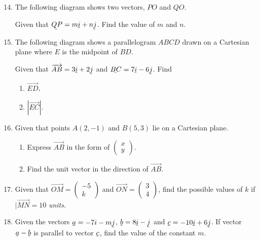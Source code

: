 \documentclass{report}
\renewcommand{\vec}[1]{\underaccent{\tilde}{#1}}
\begin{document}
\begin{multicols*}{2}
    \begin{enumerate}

        \setcounter{enumi}{13}

        \item The following diagram shows two vectors, $PO$ and $QO$.

              Given that $\vec{QP} = m\vec{i} + n\vec{j}$. Find the value of $m$ and $n$.

        \item The following diagram shows a parallelogram $ABCD$ drawn on a Cartesian plane
              where $E$ is the midpoint of $BD$.

              Given that $\overrightarrow{AB} = 3\vec{i}+2\vec{j}$ and $\vec{BC} = 7\vec{i} -
                  6\vec{j}$. Find
              \begin{enumerate}
                  \item $\overrightarrow{ED}$,
                  \item $|\overrightarrow{EC}|.$
              \end{enumerate}

        \item Given that points $A(2, -1)$ and $B(5, 3)$ lie on a Cartesian plane.
              \begin{enumerate}
                  \item Express $\overrightarrow{AB}$ in the form of $\begin{pmatrix}
                                x \\y
                            \end{pmatrix}$.
                  \item Find the unit vector in the direction of $\overrightarrow{AB}$.
              \end{enumerate}

        \item Given that $\overrightarrow{OM} = \begin{pmatrix}
                      -5 \\k
                  \end{pmatrix}$ and $\overrightarrow{ON} = \begin{pmatrix}
                      3 \\4
                  \end{pmatrix}$, find the possible values of $k$ if $|\overrightarrow{MN} = 10$\textit{ units}.

        \item Given the vectors $\vec{a} = -7i - m\vec{j}$, $\vec{b} = 8\vec{i} - \vec{j}$
              and $\vec{c} = -10\vec{i} + 6\vec{j}$. If vector $\vec{a} - \vec{b}$ is
              parallel to vector $\vec{c}$, find the value of the constant $m$.


\end{enumerate}
\end{multicols*}
\end{document}
